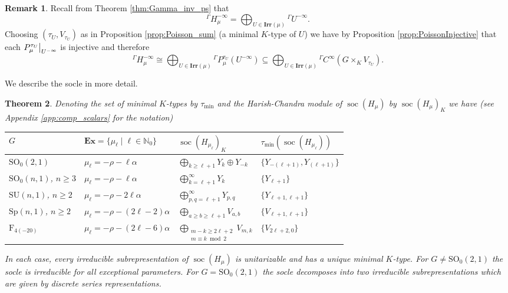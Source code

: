 \documentclass[JEP,XML,SOM,NoFloatCountersInSection,Unicode,published]{cedram}
\newcommand{\Ga}{{}^\Gamma\!}
\newtheorem{theorem}{Theorem}[section]
\theoremstyle{definition}
\newtheorem{remark}[theorem]{Remark}
\newcommand\restr[2]{{
\left.\kern-\nulldelimiterspace
#1
\vphantom{\big|}
\right|_{#2}
}}
\newcommand{\on}[1]{\ensuremath{\operatorname{#1}}}
\newcommand{\rhoa}{\ensuremath{\rho}}
\newcommand{\N}{\ensuremath{\mathbb{N}}}
\newcommand{\pst}[1]{\ensuremath{H_{#1}}}
\newcommand{\pstd}[1]{\ensuremath{H_{#1}^{-\infty}}}
\newcommand{\GSO}[1]{\ensuremath{\mathrm{SO}_0(#1,1)}}
\newcommand{\GSU}[1]{\ensuremath{\mathrm{SU}(#1,1)}}
\newcommand{\GSp}[1]{\ensuremath{\mathrm{Sp}(#1,1)}}
\newcommand{\GF}{\ensuremath{\mathrm{F}_{4(-20)}}}
\begin{document}
\begin{remark}\label{rem:poisson_qc}
Recall from Theorem \ref{thm:Gamma_inv_ps} that
\[
\Ga\pstd{\mu}=\bigoplus_{U\in\mathbf{Irr}(\mu)}{}\Ga U^{-\infty}.
\]
Choosing $(\tau_U,V_{\tau_U})$ as in Proposition \ref{prop:Poisson_sum} (\eg a minimal $K$-type of $U$) we have by Proposition \ref{prop:PoissonInjective} that each $\restr{P_\mu^{\tau_U}}{U^{-\infty}}$ is injective and therefore
\[
\Ga\pstd{\mu}\cong\bigoplus_{U\in\mathbf{Irr}(\mu)}{}\Ga P_\mu^{\tau_U}(U^{-\infty})\subseteq\bigoplus_{U\in\mathbf{Irr}(\mu)}{}\Ga C^\infty(G\times_KV_{\tau_U}).
\]
\end{remark}

We describe the socle in more detail.
\begin{theorem}\label{thm:socle}
Denoting the set of minimal $K$-types by $\tau_{\on{min}}$ and the Harish-Chandra module of $\on{soc}(\pst{\mu})$ by $\on{soc}(\pst{\mu})_K$ we have (see Appendix \ref{app:comp_scalars} for the notation)
\begin{center}
\def\arraystretch{1.2}
\setlength{\tabcolsep}{6pt}
\begin{tabular}{l|lll}
$G$&$\mathbf{Ex}=\{\mu_\ell\mid\ell\in\N_0\}$& $\on{soc}(\pst{\mu_\ell})_K$&$\tau_{\on{min}}(\on{soc}(\pst{\mu_\ell}))$\\\hline
$\GSO{2}$&$\mu_\ell=-\rhoa-\ell\alpha$&$\bigoplus_{k\geq\ell+1} Y_{k}\oplus Y_{-k}$&$\{Y_{-(\ell+1)}, Y_{(\ell+1)}\}$\\
$\GSO{n}$, $n\geq3$&$\mu_\ell=-\rhoa-\ell\alpha$&$\bigoplus_{k=\ell+1}^\infty Y_k$&$\{Y_{\ell+1}\}$\\
$\GSU{n}$, $n\geq2$&$\mu_\ell=-\rhoa-2\ell\alpha$&$\bigoplus_{p,q=\ell+1}^\infty Y_{p,q}$&$\{Y_{\ell+1,\ell+1}\}$\\
$\GSp{n}$, $n\geq2$&$\mu_\ell=-\rhoa-(2\ell-2)\alpha$&$\bigoplus_{a\geq b\geq\ell+1} V_{a,b}$&$\{V_{\ell+1,\ell+1}\}$\\
\GF&$\mu_\ell=-\rhoa-(2\ell-6)\alpha$&$\bigoplus_{\substack{m-k\geq 2\ell+2\\m\equiv k\bmod2}} V_{m,k}$&$\{V_{2\ell+2,0}\}$
\end{tabular}
\end{center}
In each case, every irreducible subrepresentation of $\on{soc}(\pst{\mu})$ is unitarizable and has a unique minimal $K$-type. For $G\neq\GSO{2}$ the socle is irreducible for all exceptional parameters. For $G=\GSO{2}$ the socle decomposes into two irreducible subrepresentations which are given by discrete series representations.
\end{theorem}
\end{document}
